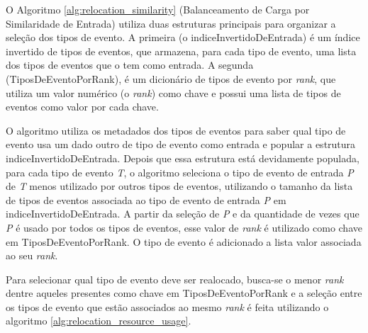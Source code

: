 O Algoritmo \ref{alg:relocation_similarity} (Balanceamento de Carga por Similaridade de Entrada) utiliza duas estruturas principais para organizar a seleção dos tipos de evento. A primeira (o indiceInvertidoDeEntrada) é um índice invertido de tipos de eventos, que armazena, para cada tipo de evento, uma lista dos tipos de eventos que o tem como entrada. A segunda (TiposDeEventoPorRank), é um dicionário de tipos de evento por \textit{rank}, que utiliza um valor numérico (o \textit{rank}) como chave e possui uma lista de tipos de eventos como valor por cada chave. 

O algoritmo utiliza os metadados dos tipos de eventos para saber qual tipo de evento usa um dado outro de tipo de evento como entrada e popular a estrutura indiceInvertidoDeEntrada. Depois que essa estrutura está devidamente populada, para cada tipo de evento \textit{T}, o algoritmo seleciona o tipo de evento de entrada \textit{P} de \textit{T} menos utilizado por outros tipos de eventos, utilizando o tamanho da lista de tipos de eventos associada ao tipo de evento de entrada \textit{P} em indiceInvertidoDeEntrada. A partir da seleção de \textit{P} e da quantidade de vezes que \textit{P} é usado por todos os tipos de eventos, esse valor de \textit{rank} é utilizado como chave em TiposDeEventoPorRank. O tipo de evento é adicionado a lista valor associada ao seu \textit{rank}. 

Para selecionar qual tipo de evento deve ser realocado, busca-se o menor \textit{rank} dentre aqueles presentes como chave em TiposDeEventoPorRank e a seleção entre os tipos de evento que estão associados ao mesmo \textit{rank} é feita utilizando o algoritmo \ref{alg:relocation_resource_usage}.





